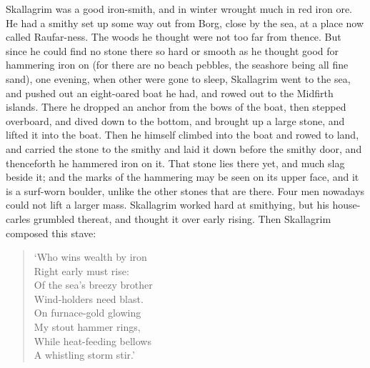 Skallagrim was a good iron-smith, and in winter wrought much in red iron ore. He had a smithy set up some way out from Borg, close by the sea, at a place now called Raufar-ness. The woods he thought were not too far from thence. But since he could find no stone there so hard or smooth as he thought good for hammering iron on (for there are no beach pebbles, the seashore being all fine sand), one evening, when other were gone to sleep, Skallagrim went to the sea, and pushed out an eight-oared boat he had, and rowed out to the Midfirth islands. There he dropped an anchor from the bows of the boat, then stepped overboard, and dived down to the bottom, and brought up a large stone, and lifted it into the boat. Then he himself climbed into the boat and rowed to land, and carried the stone to the smithy and laid it down before the smithy door, and thenceforth he hammered iron on it. That stone lies there yet, and much slag beside it; and the marks of the hammering may be seen on its upper face, and it is a surf-worn boulder, unlike the other stones that are there. Four men nowadays could not lift a larger mass. Skallagrim worked hard at smithying, but his house-carles grumbled thereat, and thought it over early rising. Then Skallagrim composed this stave:

\begin{verse}
`Who wins wealth by iron\\
Right early must rise:\\
Of the sea's breezy brother\\
Wind-holders need blast.\\
On furnace-gold glowing\\
My stout hammer rings,\\
While heat-feeding bellows\\
A whistling storm stir.'\\
\end{verse}
